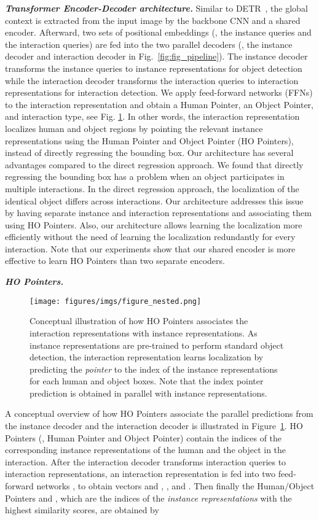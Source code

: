 \documentclass[final]{cvpr}
\begin{document}
\noindent\textit{\textbf{Transformer Encoder-Decoder architecture.}}
Similar to DETR~\cite{carion2020end}, the global context is extracted from the input image by the backbone CNN and a shared encoder.
Afterward, two sets of positional embeddings (\ie, the instance queries and the interaction queries) are fed into the two parallel decoders (\ie, the instance decoder and interaction decoder in Fig.~\ref{fig:fig_pipeline}).
The instance decoder transforms the instance queries to instance representations for object detection while the interaction decoder transforms the interaction queries to interaction representations for interaction detection.
We apply feed-forward networks (FFNs) to the interaction representation and obtain a Human Pointer, an Object Pointer, and interaction type, see Fig. \ref{fig:fig_nested}.
In other words, the interaction representation localizes human and object regions by pointing the relevant instance representations using the Human Pointer and Object Pointer (HO Pointers), instead of directly regressing the bounding box.
Our architecture has several advantages compared to the direct regression approach.
We found that directly regressing the bounding box has a problem when an object participates in multiple interactions.
In the direct regression approach, the localization of the identical object differs across interactions.
Our architecture addresses this issue by having separate instance and interaction representations and associating them using HO Pointers.
Also, our architecture allows learning the localization more efficiently without the need of learning the localization redundantly for every interaction.
Note that our experiments show that our shared encoder is more effective to learn HO Pointers than two separate encoders.
\newline

\noindent\textit{\textbf{HO Pointers.}}
\begin{figure}
    \centering
    \texttt{[image: figures/imgs/figure\_nested.png]}
    \caption{Conceptual illustration of how HO Pointers associates the interaction representations with instance representations. As instance representations are pre-trained to perform standard object detection, the interaction representation learns localization by predicting the \textit{pointer} to the index of the instance representations for each human and object boxes. Note that the index pointer prediction is obtained in parallel with instance representations.} 
    \label{fig:fig_nested}
\end{figure} A conceptual overview of how HO Pointers associate the parallel predictions from the instance decoder and the interaction decoder is illustrated in Figure~\ref{fig:fig_nested}.
HO Pointers (\ie, Human Pointer and Object Pointer) contain the indices of the corresponding instance representations of the human and the object in the interaction.
After the interaction decoder transforms  interaction queries to  interaction representations, an  interaction representation   is fed into two feed-forward networks ,  to obtain vectors  and , \ie,  and .
Then finally the Human/Object Pointers  and , which are the indices of the \textit{instance representations} with the highest similarity scores, are obtained by
\end{document}
